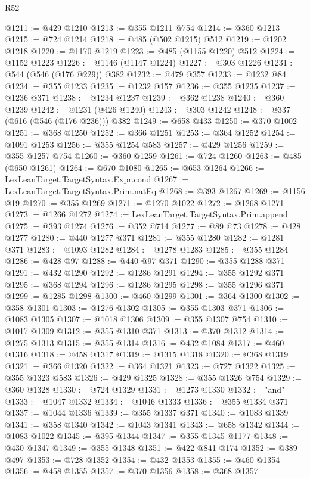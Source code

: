 \begin{lexlean}{R52}
\begin{coremodule}
@1211 := @429 @1210
@1213 := @355 @1211 @754
@1214 := @360 @1213
@1215 := @724 @1214
@1218 := @485 (@502 @1215) @512
@1219 := @1202 @1218
@1220 := @1170 @1219
@1223 := @485 (@1155 @1220) @512
@1224 := @1152 @1223
@1226 := @1146 (@1147 @1224)
@1227 := @303 @1226
@1231 := @544 (@546 (@176 @229)) @382
@1232 := @479 @357
@1233 := @1232 @84
@1234 := @355 @1233
@1235 := @1232 @157
@1236 := @355 @1235
@1237 := @1236 @371
@1238 := @1234 @1237
@1239 := @362 @1238
@1240 := @360 @1239
@1242 := @1231 (@426 @1240)
@1243 := @303 @1242
@1248 := @337 (@616 (@546 (@176 @236))) @382
@1249 := @658 @433
@1250 := @370 @1002
@1251 := @368 @1250
@1252 := @366 @1251
@1253 := @364 @1252
@1254 := @1091 @1253
@1256 := @355 @1254 @583
@1257 := @429 @1256
@1259 := @355 @1257 @754
@1260 := @360 @1259
@1261 := @724 @1260
@1263 := @485 (@650 @1261)
@1264 := @670 @1080
@1265 := @653 @1264
@1266 := LexLeanTarget.TargetSyntax.Expr.cond
@1267 := LexLeanTarget.TargetSyntax.Prim.natEq
@1268 := @393 @1267
@1269 := @1156 @19
@1270 := @355 @1269
@1271 := @1270 @1022
@1272 := @1268 @1271
@1273 := @1266 @1272
@1274 := LexLeanTarget.TargetSyntax.Prim.append
@1275 := @393 @1274
@1276 := @352 @714
@1277 := @89 @73
@1278 := @428 @1277
@1280 := @440 @1277 @371
@1281 := @355 @1280
@1282 := @1281 @371
@1283 := @1093 @1282
@1284 := @1278 @1283
@1285 := @355 @1284
@1286 := @428 @97
@1288 := @440 @97 @371
@1290 := @355 @1288 @371
@1291 := @432 @1290
@1292 := @1286 @1291
@1294 := @355 @1292 @371
@1295 := @368 @1294
@1296 := @1286 @1295
@1298 := @355 @1296 @371
@1299 := @1285 @1298
@1300 := @460 @1299
@1301 := @364 @1300
@1302 := @358 @1301
@1303 := @1276 @1302
@1305 := @355 @1303 @371
@1306 := @1083 @1305
@1307 := @1018 @1306
@1309 := @355 @1307 @754
@1310 := @1017 @1309
@1312 := @355 @1310 @371
@1313 := @370 @1312
@1314 := @1275 @1313
@1315 := @355 @1314
@1316 := @432 @1084
@1317 := @460 @1316
@1318 := @458 @1317
@1319 := @1315 @1318
@1320 := @368 @1319
@1321 := @366 @1320
@1322 := @364 @1321
@1323 := @727 @1322
@1325 := @355 @1323 @583
@1326 := @429 @1325
@1328 := @355 @1326 @754
@1329 := @360 @1328
@1330 := @724 @1329
@1331 := @1273 @1330
@1332 := "and"
@1333 := @1047 @1332
@1334 := @1046 @1333
@1336 := @355 @1334 @371
@1337 := @1044 @1336
@1339 := @355 @1337 @371
@1340 := @1083 @1339
@1341 := @358 @1340
@1342 := @1043 @1341
@1343 := @658 @1342
@1344 := @1083 @1022
@1345 := @395 @1344
@1347 := @355 @1345 @1177
@1348 := @430 @1347
@1349 := @355 @1348
@1351 := @422 @841 @174
@1352 := @389 @497
@1353 := @728 @1352
@1354 := @432 @1353
@1355 := @460 @1354
@1356 := @458 @1355
@1357 := @370 @1356
@1358 := @368 @1357

\end{coremodule}
\end{lexlean}
